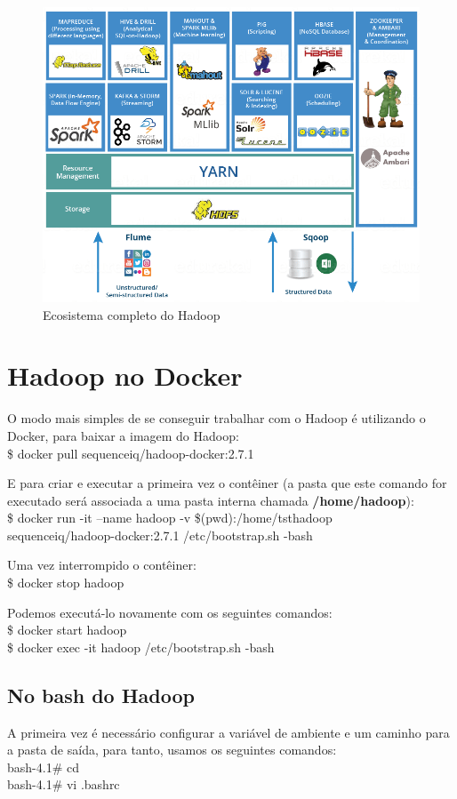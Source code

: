 \documentclass[a4paper,11pt]{article}
\begin{document}
\begin{figure}[H]
	\centering
	\includegraphics[width=1.0\textwidth]{imgHadoop/ecosistema.png}
	\caption{Ecosistema completo do Hadoop}
\end{figure}

\section{Hadoop no Docker}
O modo mais simples de se conseguir trabalhar com o Hadoop é utilizando o Docker, para baixar a imagem do Hadoop: \\
{\ttfamily\$ docker pull sequenceiq/hadoop-docker:2.7.1}

E para criar e executar a primeira vez o contêiner (a pasta que este comando for executado será associada a uma pasta interna chamada \textbf{/home/hadoop}): \\
{\ttfamily\$ docker run -it --name hadoop -v \$(pwd):/home/tsthadoop \\ sequenceiq/hadoop-docker:2.7.1 /etc/bootstrap.sh -bash}

Uma vez interrompido o contêiner: \\
{\ttfamily\$ docker stop hadoop}

Podemos executá-lo novamente com os seguintes comandos: \\
{\ttfamily\$ docker start hadoop \\
\ttfamily\$ docker exec -it hadoop /etc/bootstrap.sh -bash}

\subsection{No bash do Hadoop}
A primeira vez é necessário configurar a variável de ambiente e um caminho para a pasta de saída, para tanto, usamos os seguintes comandos: \\
{\ttfamily bash-4.1\# cd ~ \\
 \ttfamily bash-4.1\# vi .bashrc}
\end{document}
